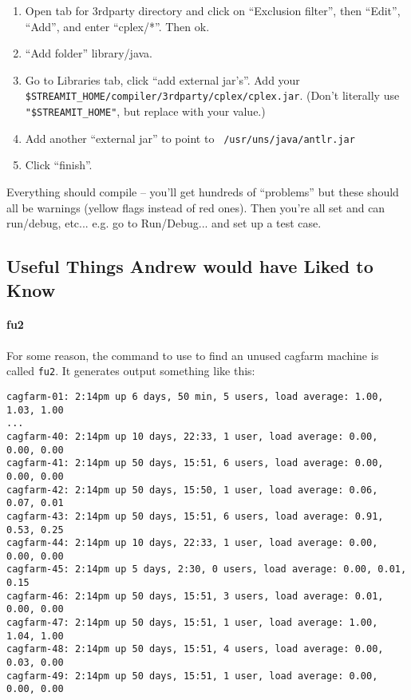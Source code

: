 \begin{enumerate}
\item Open tab for 3rdparty directory and click on ``Exclusion
filter'', then ``Edit'', ``Add'', and enter ``cplex/*''.  Then ok.

\item ``Add folder'' library/java.

\item Go to Libraries tab, click ``add external jar's''.  Add your
    {\tt \$STREAMIT\_HOME/compiler/3rdparty/cplex/cplex.jar}.  (Don't
    literally use {\tt "\$STREAMIT\_HOME"}, but replace with your
    value.)

\item Add another ``external jar'' to point to {\tt
/usr/uns/java/antlr.jar}

\item Click ``finish''.
\end{enumerate}

Everything should compile -- you'll get hundreds of ``problems'' but
these should all be warnings (yellow flags instead of red ones).  Then
you're all set and can run/debug, etc... e.g. go to Run/Debug... and
set up a test case.

\subsection{Useful Things Andrew would have Liked to Know}

\paragraph{fu2}
For some reason, the command to use to find an unused cagfarm machine
is called {\tt fu2}. It generates output something like this:
\begin{verbatim}
cagfarm-01: 2:14pm up 6 days, 50 min, 5 users, load average: 1.00, 1.03, 1.00
...
cagfarm-40: 2:14pm up 10 days, 22:33, 1 user, load average: 0.00, 0.00, 0.00
cagfarm-41: 2:14pm up 50 days, 15:51, 6 users, load average: 0.00, 0.00, 0.00
cagfarm-42: 2:14pm up 50 days, 15:50, 1 user, load average: 0.06, 0.07, 0.01
cagfarm-43: 2:14pm up 50 days, 15:51, 6 users, load average: 0.91, 0.53, 0.25
cagfarm-44: 2:14pm up 10 days, 22:33, 1 user, load average: 0.00, 0.00, 0.00
cagfarm-45: 2:14pm up 5 days, 2:30, 0 users, load average: 0.00, 0.01, 0.15
cagfarm-46: 2:14pm up 50 days, 15:51, 3 users, load average: 0.01, 0.00, 0.00
cagfarm-47: 2:14pm up 50 days, 15:51, 1 user, load average: 1.00, 1.04, 1.00
cagfarm-48: 2:14pm up 50 days, 15:51, 4 users, load average: 0.00, 0.03, 0.00
cagfarm-49: 2:14pm up 50 days, 15:51, 1 user, load average: 0.00, 0.00, 0.00
\end{verbatim}

